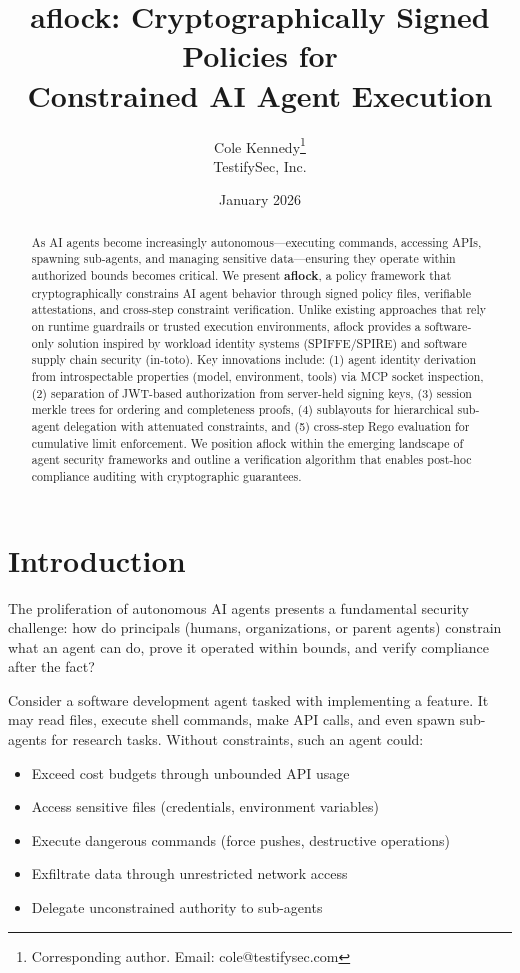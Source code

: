 \documentclass[11pt,a4paper]{article}
\title{\textbf{aflock: Cryptographically Signed Policies for\\Constrained AI Agent Execution}}
\author{
    Cole Kennedy\thanks{Corresponding author. Email: cole@testifysec.com} \\
    TestifySec, Inc.
}
\date{January 2026}
\begin{document}
\maketitle

\begin{abstract}
As AI agents become increasingly autonomous---executing commands, accessing APIs, spawning sub-agents, and managing sensitive data---ensuring they operate within authorized bounds becomes critical. We present \textbf{aflock}, a policy framework that cryptographically constrains AI agent behavior through signed policy files, verifiable attestations, and cross-step constraint verification. Unlike existing approaches that rely on runtime guardrails or trusted execution environments, aflock provides a software-only solution inspired by workload identity systems (SPIFFE/SPIRE) and software supply chain security (in-toto). Key innovations include: (1) agent identity derivation from introspectable properties (model, environment, tools) via MCP socket inspection, (2) separation of JWT-based authorization from server-held signing keys, (3) session merkle trees for ordering and completeness proofs, (4) sublayouts for hierarchical sub-agent delegation with attenuated constraints, and (5) cross-step Rego evaluation for cumulative limit enforcement. We position aflock within the emerging landscape of agent security frameworks and outline a verification algorithm that enables post-hoc compliance auditing with cryptographic guarantees.
\end{abstract}

\section{Introduction}

The proliferation of autonomous AI agents presents a fundamental security challenge: how do principals (humans, organizations, or parent agents) constrain what an agent can do, prove it operated within bounds, and verify compliance after the fact?

Consider a software development agent tasked with implementing a feature. It may read files, execute shell commands, make API calls, and even spawn sub-agents for research tasks. Without constraints, such an agent could:
\begin{itemize}[noitemsep]
    \item Exceed cost budgets through unbounded API usage
    \item Access sensitive files (credentials, environment variables)
    \item Execute dangerous commands (force pushes, destructive operations)
    \item Exfiltrate data through unrestricted network access
    \item Delegate unconstrained authority to sub-agents
\end{itemize}
\end{document}
